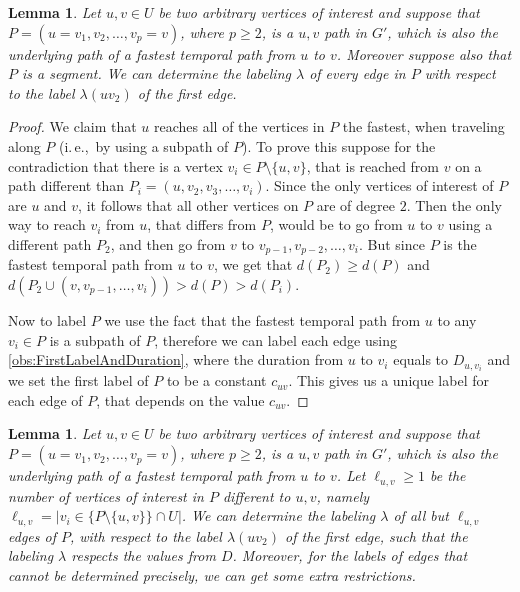 \documentclass[11pt,a4paper]{article}
\newtheorem{lemma}[theorem]{Lemma}
\theoremstyle{remark}
\theoremstyle{definition}
\newcommand{\ie}{i.\,e.,\ }
\begin{document}
\begin{lemma}\label{lemma:FPT-uv-Labelalledges}
    Let $u, v \in U$ be two arbitrary vertices of interest and suppose that $P = (u=v_1,v_2, \dots, v_p = v)$, where $p \geq 2$, 
    is a $u,v$ path in $G'$, which is also the underlying path of a fastest temporal path from $u$ to $v$.
    Moreover suppose also that $P$ is a segment.
    We can determine the labeling $\lambda$ of every edge in $P$ with respect to the label $\lambda(uv_2)$ of the first edge.
\end{lemma}

\begin{proof}
We claim that $u$ reaches all of the vertices in $P$ the fastest, when traveling along $P$ (\ie by using a subpath of $P$).
To prove this suppose for the contradiction that there is a vertex $v_i \in P \setminus \{u,v\}$, that is reached from $v$ on a path different than $P_i = (u, v_2, v_3, \dots, v_i)$.
Since the only vertices of interest of $P$ are $u$ and $v$, it follows that all other vertices on $P$ are of degree $2$. 
Then the only way to reach $v_i$ from $u$, that differs from $P$, would be to go from $u$ to $v$ using a different path $P_2$,
and then go from $v$ to $v_{p-1}, v_{p-2}, \dots, v_i$.
But since $P$ is the fastest temporal path from $u$ to $v$, we get that $d(P_2) \geq d(P)$ and $d(P_2 \cup (v,v_{p-1}, \dots, v_i)) > d(P) > d(P_i)$.

Now to label $P$ we use the fact that the fastest temporal path from $u$ to any $v_i \in P$ is a subpath of $P$, 
therefore we can label each edge using \cref{obs:FirstLabelAndDuration},
where the duration from $u$ to $v_i$ equals to $D_{u,v_i}$ and 
we set the first label of $P$ to be a constant $c_{uv}$.
This gives us a unique label for each edge of $P$, that depends on the value $c_{uv}$.
\end{proof}

\begin{lemma}\label{lemma:FPT-uv-LabelAlmostalledges}
    Let $u, v \in U$ be two arbitrary vertices of interest and suppose that $P = (u=v_1, v_2, \dots, v_p = v)$, where $p \geq 2$, 
    is a $u,v$ path in $G'$, which is also the underlying path of a fastest temporal path from $u$ to $v$.
    Let $\ell_{u,v} \geq 1$ be the number of vertices of interest in $P$ different to $u,v$, namely $\ell_{u,v} = | v_i \in \{P \setminus \{u,v \} \} \cap U |$.
    We can determine the labeling $\lambda$ of all but $\ell_{u,v}$ edges of $P$, with respect to the label $\lambda(uv_2)$ of the first edge,
    such that the labeling $\lambda$ respects the values from $D$.
    Moreover, for the labels of edges that cannot be determined precisely, we can get some extra restrictions.
\end{lemma}
\end{document}
